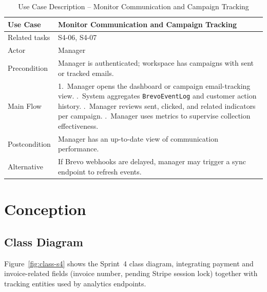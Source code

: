 \documentclass[12pt,a4paper]{report}
\newcommand{\reporttablesetup}{%
  \small%
  \setlength{\tabcolsep}{5pt}%
  \renewcommand{\arraystretch}{1.22}%
  \arrayrulecolor{framegray}%
}
\begin{document}
\begin{table}[H]
  \centering
  \reporttablesetup
  \begin{tabularx}{\textwidth}{|p{3.1cm}|Y|}
    \hline
    Use Case      & Monitor Communication and Campaign Tracking \\
    \hline
    Related tasks & S4-06, S4-07 \\
    \hline
    Actor         & Manager \\
    \hline
    Precondition  & Manager is authenticated; workspace has campaigns with sent or
                    tracked emails. \\
    \hline
    Main Flow     & 1.\ Manager opens the dashboard or campaign email-tracking view.
                        .\ System aggregates \texttt{BrevoEventLog} and customer action
                        history. .\ Manager reviews sent, clicked, and related indicators per
                        campaign. .\ Manager uses metrics to supervise collection effectiveness. \\
    \hline
    Postcondition & Manager has an up-to-date view of communication performance. \\
    \hline
    Alternative   & If Brevo webhooks are delayed, manager may trigger a sync endpoint
                    to refresh events. \\
    \hline
  \end{tabularx}
  \caption{Use Case Description -- Monitor Communication and Campaign Tracking}
  \label{tab:uc10}
\end{table}

\FloatBarrier

\section{Conception}

\subsection{Class Diagram}

Figure~\ref{fig:class-s4} shows the Sprint~4 class diagram, integrating payment and
invoice-related fields (invoice number, pending Stripe session lock) together with
tracking entities used by analytics endpoints.
\end{document}

